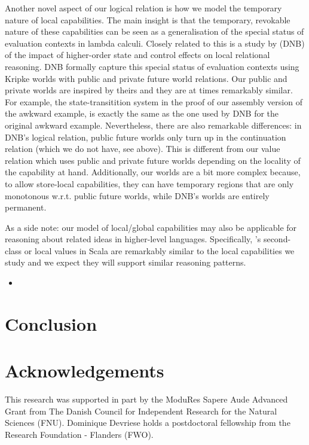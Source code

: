 \documentclass[compsoc,conference,letterpaper,fleqn]{IEEEtran}
\begin{document}
Another novel aspect of our logical relation is how we model the temporary
nature of local capabilities. The main insight is that the temporary, revokable
nature of these capabilities can be seen as a generalisation of the special
status of evaluation contexts in lambda calculi. Closely related to this is a
study by \citet{Dreyer:jfp12} (DNB) of the impact of higher-order state and
control effects on local relational reasoning. DNB formally capture this special
status of evaluation contexts using Kripke worlds with public and private future
world relations. Our public and private worlds are inspired by theirs and they
are at times remarkably similar. For example, the state-transitition system in
the proof of our assembly version of the awkward example, is exactly the same as
the one used by DNB for the original awkward example. Nevertheless, there are
also remarkable differences: in DNB's logical relation, public future worlds
only turn up in the continuation relation (which we do not have, see above).
This is different from our value relation which uses public and private future
worlds depending on the locality of the capability at hand. Additionally, our
worlds are a bit more complex because, to allow store-local capabilities, they
can have temporary regions that are only monotonous w.r.t. public future worlds,
while DNB's worlds are entirely permanent.

As a side note: our model of local/global capabilities may also be applicable
for reasoning about related ideas in higher-level languages. Specifically,
\citet{osvald_gentrification_2016}'s second-class or local values in Scala are
remarkably similar to the local capabilities we study and we expect they will
support similar reasoning patterns.


\begin{itemize}
\item \cite{akram_el-korashy_formal_2016}
\end{itemize}

\section{Conclusion}
\label{sec:conclusion}

\section*{Acknowledgements}
\label{sec:acknowledgements}

This research was supported in part by the ModuRes Sapere Aude Advanced Grant from The Danish Council for Independent Research for the Natural Sciences (FNU).
Dominique Devriese holds a postdoctoral fellowship from the Research Foundation - Flanders (FWO).

%


\end{document}
